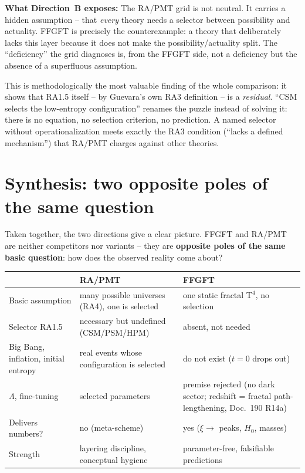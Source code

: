 \textbf{What Direction~B exposes:} The RA/PMT grid is not neutral. It
carries a hidden assumption -- that \emph{every} theory needs a selector
between possibility and actuality. FFGFT is precisely the counterexample:
a theory that deliberately lacks this layer because it does not make the
possibility/actuality split. The ``deficiency'' the grid diagnoses is,
from the FFGFT side, not a deficiency but the absence of a superfluous
assumption.

This is methodologically the most valuable finding of the whole
comparison: it shows that RA1.5 itself -- by Guevara's own RA3
definition -- is a \emph{residual}. ``CSM selects the low-entropy
configuration'' renames the puzzle instead of solving it: there is no
equation, no selection criterion, no prediction. A named selector
without operationalization meets exactly the RA3 condition (``lacks a
defined mechanism'') that RA/PMT charges against other theories.

\section{Synthesis: two opposite poles of the same question}

Taken together, the two directions give a clear picture. FFGFT and
RA/PMT are neither competitors nor variants -- they are \textbf{opposite
poles of the same basic question}: how does the observed reality come
about?

\begin{center}
\begin{tabular}{p{4cm}p{4cm}p{4cm}}
\toprule
 & \textbf{RA/PMT} & \textbf{FFGFT} \\
\midrule
Basic assumption & many possible universes (RA4), one is selected &
  one static fractal T$^4$, no selection \\
\addlinespace
Selector RA1.5 & necessary but undefined (CSM/PSM/HPM) &
  absent, not needed \\
\addlinespace
Big Bang, inflation, initial entropy & real events whose configuration
  is selected & do not exist ($t=0$ drops out) \\
\addlinespace
$\Lambda$, fine-tuning & selected parameters &
  premise rejected (no dark sector; redshift =
  fractal path-lengthening, Doc.~190 R14a) \\
\addlinespace
Delivers numbers? & no (meta-scheme) & yes ($\xi \to$ peaks, $H_0$, masses) \\
\addlinespace
Strength & layering discipline, conceptual hygiene &
  parameter-free, falsifiable predictions \\
\bottomrule
\end{tabular}
\end{center}

